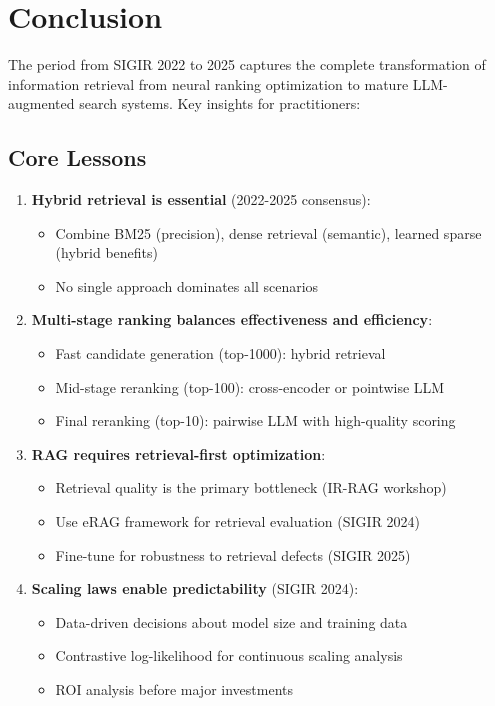 \documentclass[11pt,letterpaper]{article}
\begin{document}
\section{Conclusion}

The period from SIGIR 2022 to 2025 captures the complete transformation of information retrieval from neural ranking optimization to mature LLM-augmented search systems. Key insights for practitioners:

\subsection{Core Lessons}

\begin{enumerate}[leftmargin=*]
    \item \textbf{Hybrid retrieval is essential} (2022-2025 consensus):
    \begin{itemize}
        \item Combine BM25 (precision), dense retrieval (semantic), learned sparse (hybrid benefits)
        \item No single approach dominates all scenarios
    \end{itemize}

    \item \textbf{Multi-stage ranking balances effectiveness and efficiency}:
    \begin{itemize}
        \item Fast candidate generation (top-1000): hybrid retrieval
        \item Mid-stage reranking (top-100): cross-encoder or pointwise LLM
        \item Final reranking (top-10): pairwise LLM with high-quality scoring
    \end{itemize}

    \item \textbf{RAG requires retrieval-first optimization}:
    \begin{itemize}
        \item Retrieval quality is the primary bottleneck (IR-RAG workshop)
        \item Use eRAG framework for retrieval evaluation (SIGIR 2024)
        \item Fine-tune for robustness to retrieval defects (SIGIR 2025)
    \end{itemize}

    \item \textbf{Scaling laws enable predictability} (SIGIR 2024):
    \begin{itemize}
        \item Data-driven decisions about model size and training data
        \item Contrastive log-likelihood for continuous scaling analysis
        \item ROI analysis before major investments
    \end{itemize}


\end{enumerate}
\end{document}
